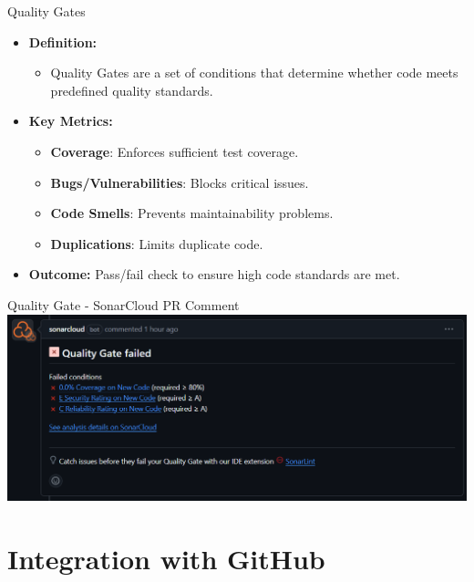 \documentclass{beamer}
\begin{document}
\begin{frame}{Quality Gates}
  \begin{itemize}
    \item \textbf{Definition:}
    \begin{itemize}
      \item Quality Gates are a set of conditions that determine whether code meets predefined quality standards.
    \end{itemize}

    \vspace*{1em}

    \item \textbf{Key Metrics:}
    \begin{itemize}
        \item \textbf{Coverage}: Enforces sufficient test coverage.
        \item \textbf{Bugs/Vulnerabilities}: Blocks critical issues.
        \item \textbf{Code Smells}: Prevents maintainability problems.
        \item \textbf{Duplications}: Limits duplicate code.
    \end{itemize}
    
    \vspace*{1em}

    \item \textbf{Outcome:}
    Pass/fail check to ensure high code standards are met.
  \end{itemize}
\end{frame}

\begin{frame}{Quality Gate - SonarCloud PR Comment}
  \includegraphics[width=1.0\textwidth]{fig/q-gate-1.png}
\end{frame}

\section[ Integration with GitHub]{Integration with GitHub}
\end{document}
